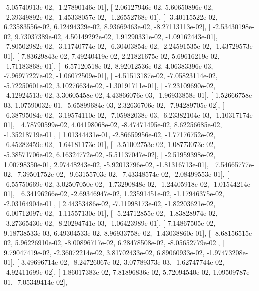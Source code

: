 \documentclass{article}
\begin{document}
         -5.05740913e-02,  -1.27890146e-01],
       [  2.06127946e-02,   5.60650896e-02,  -2.39349892e-02,
         -1.45338057e-02,  -1.26552768e-01],
       [ -3.40115522e-02,   6.23583556e-02,   6.12494329e-02,
          8.93669463e-02,  -8.27113113e-02],
       [ -2.53430198e-02,   9.73037389e-02,   4.50149292e-02,
          1.91290331e-02,  -1.09162443e-01],
       [ -7.80502982e-02,  -3.11740774e-02,  -6.30403854e-02,
         -2.24591535e-02,  -1.43729573e-01],
       [  7.83629843e-02,   7.49240419e-02,   2.21821675e-02,
          5.69616219e-02,  -1.71183868e-01],
       [ -6.57120518e-02,   8.92012536e-02,   4.06383396e-03,
         -7.96977227e-02,  -1.06072509e-01],
       [ -4.51513187e-02,  -7.05823114e-02,  -5.72250601e-02,
          3.10276634e-02,  -1.30191711e-01],
       [ -7.23109690e-02,  -4.12924513e-02,   3.30605458e-02,
          4.43866076e-03,  -1.96933858e-01],
       [  1.52666758e-03,   1.07590032e-01,  -5.65899684e-03,
          2.32636706e-02,  -7.94289705e-02],
       [ -6.38795084e-02,  -3.19574110e-02,  -7.05982038e-03,
         -6.23382104e-03,  -1.10317174e-01],
       [  4.78790599e-02,   4.04198068e-02,  -8.47471495e-02,
          8.62256685e-02,  -1.35218719e-01],
       [  1.01344431e-01,  -2.86659956e-02,  -1.77176752e-02,
         -6.45282459e-02,  -1.64181173e-01],
       [ -3.51002753e-02,   1.08773073e-02,  -5.38571706e-02,
          6.16324772e-02,  -5.51137047e-02],
       [ -2.51959398e-02,   1.00798350e-01,   2.97448243e-02,
         -5.92013796e-02,  -1.81316713e-01],
       [  7.54665777e-02,  -7.39501752e-02,  -9.63155703e-02,
         -7.43348574e-02,  -2.08499553e-01],
       [ -6.55750669e-02,   3.02507050e-02,  -1.73290848e-02,
         -1.24405918e-02,  -1.01544214e-01],
       [  6.34196266e-02,  -2.69346947e-02,   1.23591451e-02,
         -1.17946375e-02,  -2.03164904e-01],
       [  2.44353486e-02,  -7.11998173e-02,  -1.82203621e-02,
         -6.00712097e-02,  -1.11557130e-01],
       [ -5.24712855e-02,  -1.83828974e-02,  -3.27365430e-02,
         -8.20294741e-03,  -1.06423989e-01],
       [  7.14867505e-02,   9.18738533e-03,   6.49304533e-02,
          8.96933758e-02,  -1.43038860e-01],
       [ -8.68156515e-02,   5.96226910e-02,  -8.00896717e-02,
          6.28478508e-02,  -8.05652779e-02],
       [  9.79047419e-02,  -2.36072214e-02,   3.81702433e-02,
          6.89060933e-02,  -1.97473208e-01],
       [  3.49696714e-02,  -8.24726067e-02,   3.07789373e-03,
         -1.62747744e-02,  -4.92411699e-02],
       [  1.86017383e-02,   7.81896836e-02,   5.72094540e-02,
          1.09509787e-01,  -7.05349414e-02],
\end{document}
